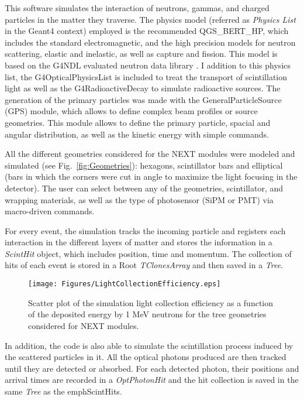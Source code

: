 This software simulates the interaction of neutrons, gammas, and charged particles in the matter they traverse. The  physics model (referred as \emph{Physics List} in the {\sc Geant4} context) employed is the recommended QGS\_BERT\_HP, which includes the standard electromagnetic, and the high precision models for neutron scattering, elastic and inelastic, as well as capture and fission.  This model is based on the G4NDL evaluated neutron data library \cite{Apostolakis2009}. I addition to this physics list, the G4OpticalPhysicsList is included to treat the transport of scintillation light as well as the G4RadioactiveDecay to simulate radioactive sources. The generation of the primary particles  was made with the GeneralParticleSource (GPS) module, which allows to define complex beam profiles or source geometries. This module allows to define the primary particle,  spacial and angular distribution, as well as the kinetic energy with simple commands.
 
 All the different geometries considered for the NEXT modules were modeled and simulated (see  Fig.~\ref{fig:Geometries}): hexagons, scintillator bars and elliptical (bars in which the corners were cut in angle to maximize the light focusing in the detector). The user can select between any of the geometries, scintillator, and wrapping materials, as well as the type of photosensor (SiPM or PMT) via macro-driven commands. 

For every event, the simulation tracks the incoming particle and registers each interaction in the different layers of matter and stores the information in a \emph{ScintHit} object, which includes position, time and momentum. The collection of hits of each event is stored in a  {\sc Root} \emph{TClonesArray} and then saved in a \emph{Tree}.

\begin{figure}[hbt]
\centering
\texttt{[image: Figures/LightCollectionEfficiency.eps]}
\caption{Scatter plot of the simulation  light collection efficiency as a function of the deposited energy by 1 MeV neutrons for the tree geometries considered for NEXT modules.}
\label{fig:Efficiency}
\end{figure}

In addition, the code is also able to simulate the scintillation process induced by the scattered particles in it. All the optical photons produced are then tracked until they are detected or absorbed. For each detected photon, their positions and arrival times are recorded in  a \emph{OptPhotonHit} and the hit collection is saved in the same  \emph{Tree} as the emph{ScintHits}.

